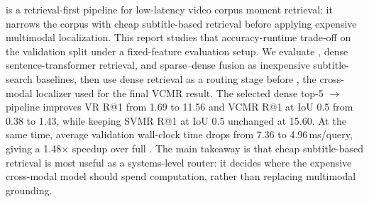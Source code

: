 \system is a retrieval-first pipeline for low-latency video corpus moment retrieval: it narrows the corpus with cheap subtitle-based retrieval before applying expensive multimodal localization. This report studies that accuracy-runtime trade-off on the \dataset validation split under a fixed-feature evaluation setup. We evaluate \bm, dense sentence-transformer retrieval, and sparse--dense fusion as inexpensive subtitle-search baselines, then use dense retrieval as a routing stage before \xml, the cross-modal localizer used for the final VCMR result. The selected dense top-5 $\rightarrow$ \xml pipeline improves VR R@1 from 1.69 to 11.56 and VCMR R@1 at IoU 0.5 from 0.38 to 1.43, while keeping SVMR R@1 at IoU 0.5 unchanged at 15.60. At the same time, average validation wall-clock time drops from 7.36 to 4.96\,ms/query, giving a 1.48$\times$ speedup over full \xml. The main takeaway is that cheap subtitle-based retrieval is most useful as a systems-level router: it decides where the expensive cross-modal model should spend computation, rather than replacing multimodal grounding.
